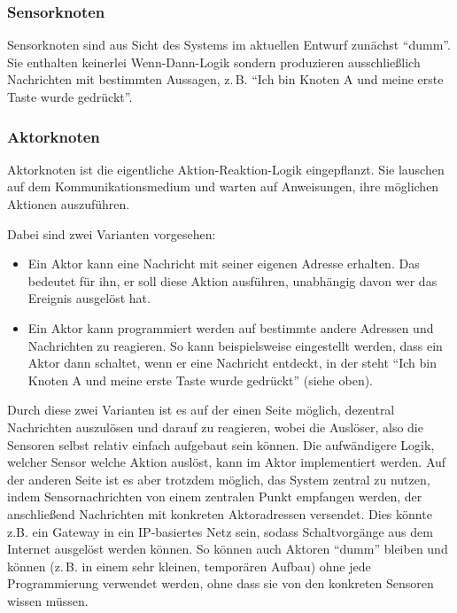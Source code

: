 \documentclass{IEEEtran}
\begin{document}
        \subsubsection{Sensorknoten}\label{Sensorknoten}
            Sensorknoten sind aus Sicht des Systems im aktuellen Entwurf
            zunächst \enquote{dumm}. Sie enthalten keinerlei Wenn-Dann-Logik
            sondern produzieren ausschließlich Nachrichten mit bestimmten
            Aussagen, z.\,B. \enquote{Ich bin Knoten A und meine erste Taste
            wurde gedrückt}.
        \subsubsection{Aktorknoten}\label{Aktorknoten}
            Aktorknoten ist die eigentliche Aktion-Reaktion-Logik eingepflanzt.
            Sie lauschen auf dem Kommunikationsmedium und warten auf Anweisungen,
            ihre möglichen Aktionen auszuführen.

            Dabei sind zwei Varianten vorgesehen:
            \begin{itemize}
                \item Ein Aktor kann eine Nachricht mit seiner eigenen Adresse
                    erhalten. Das bedeutet für ihn, er soll diese Aktion
                    ausführen, unabhängig davon wer das Ereignis ausgelöst hat.
                \item Ein Aktor kann programmiert werden auf bestimmte andere
                    Adressen und Nachrichten zu reagieren.
                    So kann beispielsweise eingestellt werden, dass ein Aktor
                    dann schaltet, wenn er eine Nachricht entdeckt, in der steht
                    \enquote{Ich bin Knoten A und meine erste Taste
                    wurde gedrückt} (siehe oben).
            \end{itemize}

            Durch diese zwei Varianten ist es auf der einen Seite möglich,
            dezentral Nachrichten auszulösen und darauf zu reagieren, wobei
            die Auslöser, also die Sensoren selbst relativ einfach aufgebaut
            sein können. Die aufwändigere Logik, welcher Sensor welche Aktion
            auslöst, kann im Aktor implementiert werden.
            Auf der anderen Seite ist es aber trotzdem möglich, das System
            zentral zu nutzen, indem Sensornachrichten von einem zentralen
            Punkt empfangen werden, der anschließend Nachrichten mit konkreten
            Aktoradressen versendet.
            Dies könnte z.B. ein Gateway in ein IP-basiertes Netz sein, sodass
            Schaltvorgänge aus dem Internet ausgelöst werden können.
            So können auch Aktoren \enquote{dumm}
            bleiben und können (z.\,B. in einem sehr kleinen, temporären Aufbau)
            ohne jede Programmierung verwendet werden, ohne dass sie von den
            konkreten Sensoren wissen müssen.
\end{document}
